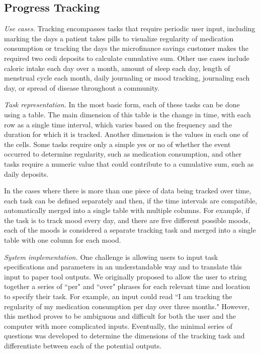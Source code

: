 \documentclass{sig-alternate}
\begin{document}
\subsection{Progress Tracking}
\label{sec:tracking}

\emph{Use cases.}
Tracking encompasses tasks that require periodic user input, including marking the days a patient takes pills to visualize regularity of medication consumption or tracking the days the microfinance savings customer makes the required two cedi deposits to calculate cumulative sum. Other use cases include caloric intake each day over a month, amount of sleep each day, length of menstrual cycle each month, daily journaling or mood tracking, journaling each day, or spread of disease throughout a community.

\emph{Task representation.}
In the most basic form, each of these tasks can be done using a table. The main dimension of this table is the change in time, with each row as a single time interval, which varies based on the frequency and the duration for which it is tracked. Another dimension is the values in each one of the cells. Some tasks require only a simple yes or no of whether the event occurred to determine regularity, such as medication consumption, and other tasks require a numeric value that could contribute to a cumulative sum, such as daily deposits.

In the cases where there is more than one piece of data being tracked over time, each task can be defined separately and then, if the time intervals are compatible, automatically merged into a single table with multiple columns. For example, if the task is to track mood every day, and there are five different possible moods, each of the moods is considered a separate tracking task and merged into a single table with one column for each mood. 


\emph{System implementation.}
One challenge is allowing users to input task specifications and parameters in an understandable way and to translate this input to paper tool outputs. We originally proposed to allow the user to string together a series of ``per" and ``over" phrases for each relevant time and location to specify their task. For example, an input could read ``I am tracking the regularity of my medication consumption per day over three months." However, this method proves to be ambiguous and difficult for both the user and the computer with more complicated inputs. Eventually, the minimal series of questions was developed to determine the dimensions of the tracking task and differentiate between each of the potential outputs. 
\end{document}
